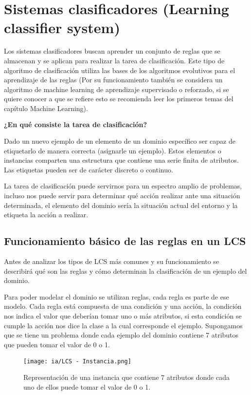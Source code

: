 \documentclass[11pt,fleqn]{book} %
\begin{document}
\section{Sistemas clasificadores (Learning classifier system)}  

Los sistemas clasificadores buscan aprender un conjunto de reglas que se almacenan y se aplican para realizar la tarea de clasificación. Este tipo de algoritmo de clasificación utiliza las bases de los algoritmos evolutivos para el aprendizaje de las reglas (Por su funcionamiento también se considera un algoritmo de machine learning de aprendizaje supervisado o reforzado, si se quiere conocer a que se refiere esto se recomienda leer los primeros temas del capítulo Machine Learning).

\clearpage
\textbf{¿En qué consiste la tarea de clasificación?}

Dado un nuevo ejemplo de un elemento de un dominio específico ser capaz de etiquetarlo de manera correcta (asignarle un ejemplo).
Estos elementos o instancias comparten una estructura que contiene una serie finita de atributos.
Las etiquetas pueden ser de carácter discreto o continuo.

La tarea de clasificación puede servirnos para un espectro amplio de problemas, incluso nos puede servir para determinar qué acción realizar ante una situación determinada, el elemento del dominio sería la situación actual del entorno y la etiqueta la acción a realizar.

\subsection{Funcionamiento básico de las reglas en un LCS} 

Antes de analizar los tipos de LCS más comunes y su funcionamiento se describirá qué son las reglas y cómo determinan la clasificación de un ejemplo del dominio.

Para poder modelar el dominio se utilizan reglas, cada regla es parte de ese modelo. Cada regla está compuesta de una condición y una acción, la condición nos indica el valor que deberían tomar uno o más atributos, si esta condición se cumple la acción nos dice la clase a la cual corresponde el ejemplo. Supongamos que se tiene un problema donde cada ejemplo del dominio contiene 7 atributos que pueden tomar el valor de 0 o 1.

\begin{figure}[ht]
\centering\texttt{[image: ia/LCS - Instancia.png]}
\caption{Representación de una instancia que contiene 7 atributos donde cada uno de ellos puede tomar el valor de 0 o 1.}
\label{fig:LCS-Instancia} 
\end{figure}
\end{document}
